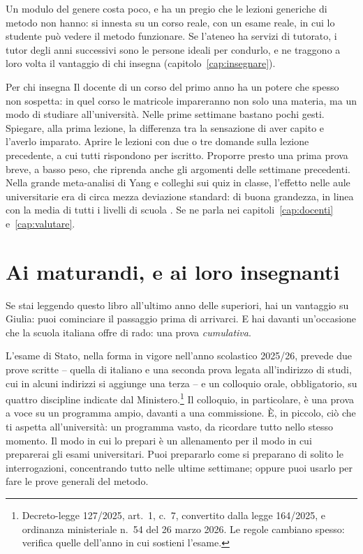 Un modulo del genere costa poco, e ha un pregio che le lezioni
generiche di metodo non hanno: si innesta su un corso reale, con un
esame reale, in cui lo studente può vedere il metodo funzionare. Se
l'ateneo ha servizi di tutorato, i tutor degli anni successivi sono le
persone ideali per condurlo, e ne traggono a loro volta il vantaggio di
chi insegna (capitolo~\ref{cap:insegnare}).

\begin{riquadro}{Per chi insegna}
Il docente di un corso del primo anno ha un potere che spesso non
sospetta: in quel corso le matricole impareranno non solo una materia,
ma un modo di studiare all'università. Nelle prime settimane bastano
pochi gesti. Spiegare, alla prima lezione, la differenza tra la
sensazione di aver capito e l'averlo imparato. Aprire le lezioni con
due o tre domande sulla lezione precedente, a cui tutti rispondono per
iscritto. Proporre presto una prima prova breve, a basso peso, che
riprenda anche gli argomenti delle settimane precedenti. Nella grande
meta-analisi di Yang e colleghi sui quiz in classe, l'effetto nelle
aule universitarie era di circa mezza deviazione standard: di buona
grandezza, in linea con la media di tutti i livelli di scuola
\parencite{yang2021}. Se
ne parla nei capitoli~\ref{cap:docenti} e~\ref{cap:valutare}.
\end{riquadro}

\section{Ai maturandi, e ai loro insegnanti}

Se stai leggendo questo libro all'ultimo anno delle superiori, hai un
vantaggio su Giulia: puoi cominciare il passaggio prima di arrivarci. E
hai davanti un'occasione che la scuola italiana offre di rado: una
prova \emph{cumulativa}.

L'esame di Stato, nella forma in vigore nell'anno scolastico 2025/26,
prevede due prove scritte -- quella di italiano e una seconda prova
legata all'indirizzo di studi, cui in alcuni indirizzi si aggiunge una terza -- e un colloquio orale, obbligatorio, su quattro discipline indicate dal Ministero.\footnote{Decreto-legge 127/2025, art.~1, c.~7, convertito dalla legge 164/2025, e ordinanza ministeriale n.~54 del 26 marzo 2026. Le regole cambiano spesso: verifica quelle dell'anno in cui sostieni l'esame.} Il colloquio, in particolare, è una prova a voce su un programma ampio, davanti a una commissione. È, in piccolo, ciò che ti aspetta all'università: un programma vasto, da
ricordare tutto nello stesso momento. Il
modo in cui lo prepari è un allenamento per il modo in cui preparerai
gli esami universitari. Puoi prepararlo come si preparano di solito le
interrogazioni, concentrando tutto nelle ultime settimane; oppure puoi
usarlo per fare le prove generali del metodo.

